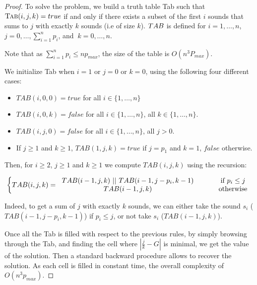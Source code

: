 \documentclass[a4paper]{book}
\newtheorem{proof}{\noindent{\bf Proof.} }
\begin{document}
\begin{proof}

To solve the problem, we build  a truth table {\sc Tab} such that $\text{\sc{Tab}}(i,j,k) = true$ if and only if there exists a subset of the first $i$ sounds that sums to $j$ with exactly $k$ sounds (i.e of size $k$). ${\sc TAB}$ is defined for $i=1,\ldots, n$, $j=0,\ldots,\sum_{i=1}^n p_i$, and $\ k=0,\ldots,n$. 

Note that as $\sum_{i=1}^n p_i\leq np_{max}$, the size of the table is $O(n^3P_{max})$. 


We initialize {\sc Tab} when $i=1$ or $j=0$ or $k=0$, using the following four different cases: 
\begin{itemize}
		\item $TAB(i,0,0)=true$ for all $i \in \{1,\ldots,n\} $
	\item $TAB(i,0,k)=false$ for all $i \in \{1,\ldots,n\}$, all  $k \in \{ 1,\ldots,n\}$.
\item $TAB(i,j,0)=false$  for all $i \in \{1,\ldots,n\}$, all $j>0$.
	\item If $j\geq 1$ and $k\geq 1$, $TAB(1,j,k)=true$ if $j=p_1$ and $k=1$, $ false$ otherwise.
\end{itemize}

Then, for $i\geq 2$, $j\geq 1$ and $k\geq 1$ we compute $TAB(i,j,k)$ using the recursion:

 \[  \left \{  TAB(i,j,k)=
\begin{tabular}{cccc}
$TAB(i-1,j,k) \  ||\  TAB(i-1,j-p_i,k-1)$ &&&if $p_i \leq j$ \\
$TAB(i-1,j,k)$&&&otherwise\\

\end{tabular} 
\right.
\]

Indeed, to get a sum of $j$ with exactly $k$ sounds, we can either take the sound $s_i$ ($TAB(i-1,j-p_i,k-1)$) if $p_i\leq j$, or not take $s_i$ ($TAB(i-1,j,k)$).

Once all the {\sc Tab} is filled with respect to the previous rules, by simply browsing through the {\sc Tab}, and finding the cell where $|\frac{j}{k}-G|$ is minimal, we get the value of the solution. Then a standard backward procedure allows to recover the solution. As each cell is filled in constant time,
the overall complexity of $O(n^3p_{max})$.
\end{proof}
\end{document}
